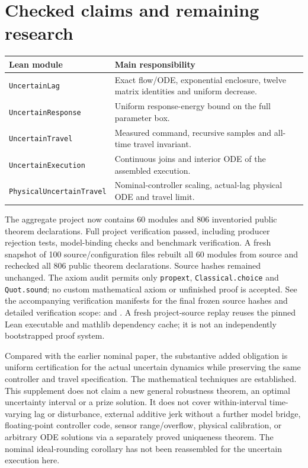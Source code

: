 \documentclass[10pt]{article}
\begin{document}
\section{Checked claims and remaining research}
\begin{center}\small
\begin{tabularx}{\linewidth}{@{}lX@{}}
\toprule
Lean module & Main responsibility\\\midrule
\texttt{UncertainLag} & Exact flow/ODE, exponential enclosure, twelve matrix identities and uniform decrease.\\
\texttt{UncertainResponse} & Uniform response-energy bound on the full parameter box.\\
\texttt{UncertainTravel} & Measured command, recursive samples and all-time travel invariant.\\
\texttt{UncertainExecution} & Continuous joins and interior ODE of the assembled execution.\\
\texttt{PhysicalUncertainTravel} & Nominal-controller scaling, actual-lag physical ODE and travel limit.\\\bottomrule
\end{tabularx}
\end{center}
The aggregate project now contains 60 modules and 806 inventoried public theorem
declarations. Full project verification passed, including producer rejection
tests, model-binding checks and benchmark verification. A fresh snapshot of 100
source/configuration files rebuilt all 60 modules from source and rechecked all
806 public theorem declarations. Source hashes remained unchanged. The axiom audit permits only \texttt{propext},
\texttt{Classical.choice} and \texttt{Quot.sound}; no custom mathematical axiom or
unfinished proof is accepted. See the accompanying verification manifests for the
final frozen source hashes and detailed verification scope:
 and
.
A fresh project-source replay reuses the pinned Lean executable and mathlib
dependency cache; it is not an independently bootstrapped proof system.

Compared with the earlier nominal paper, the substantive added obligation is
uniform certification for the actual uncertain dynamics while preserving the
same controller and travel specification. The mathematical techniques are
established. This supplement does not claim a new general robustness theorem,
an optimal uncertainty interval or a prize solution.
It does not cover within-interval time-varying lag or disturbance, external
additive jerk without a further model bridge, floating-point controller code,
sensor range/overflow, physical calibration, or arbitrary ODE solutions via a
separately proved uniqueness theorem. The nominal ideal-rounding corollary has
not been reassembled for the uncertain execution here.
\end{document}
